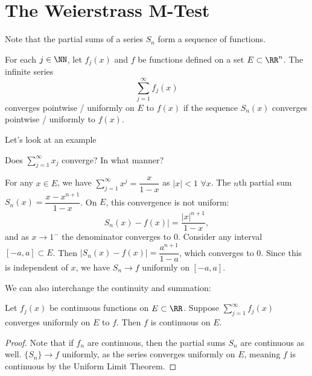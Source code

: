  \section{The Weierstrass M-Test}
Note that the partial sums of a series $S_n$ form a sequence of functions. 
\begin{definition}
	For each $j \in \NN$, let $f_j(x)$ and $f$ be functions defined on a set $E \subset \RR^n$. The infinite series 
	\[ \sum\limits_{j=1}^\infty f_j(x) \] converges pointwise / uniformly on $E$ to $f(x)$ if the sequence $S_n(x)$ converges pointwise / uniformly to $f(x)$. 
\end{definition}
Let's look at an example 
\begin{example}
Does $\sum\limits_{j=1}^\infty x_j$ converge? In what manner?
\end{example}
\begin{sol}
For any $x \in E$, we have $\sum\limits_{j=1}^\infty x^j = \dfrac{x}{1-x}$ as $|x| < 1$ $\forall x$. The $n$th partial sum $S_n(x) = \dfrac{x-x^{n+1}}{1-x}$. On $E$, this convergence is not uniform: 
\[ S_n(x) - f(x)| = \dfrac{|x|^{n+1}}{1-x}, \]  and as $x \to 1^-$ the denominator converges to 0. Consider any interval $[-a, a] \subset E$. Then $|S_n(x) - f(x)| = \dfrac{a^{n+1}}{1-a}$, which converges to 0. Since this is independent of $x$, we have $S_n \to f$ uniformly on $[-a, a]$. 
\end{sol}

We can also interchange the continuity and summation:
\begin{theorem}
Let $f_j(x)$ be continuous functions on $E \subset \RR$. Suppose $\sum\limits_{j=1}^\infty f_j(x)$ converges uniformly on $E$ to $f$. Then $f$ is continuous on $E$. 
\end{theorem}
\begin{proof}
Note that if $f_n$ are continuous, then the partial sums $S_n$ are continuous as well. $\{S_n\} \to f$ uniformly, as the series converges uniformly on $E$, meaning $f$ is continuous by the Uniform Limit Theorem. 
\end{proof}

